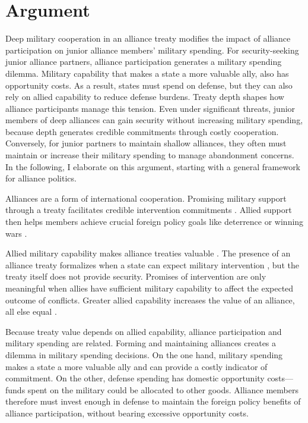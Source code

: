 \documentclass[12pt]{article}
\begin{document}
\section{Argument}

Deep military cooperation in an alliance treaty modifies the impact of alliance participation on junior alliance members' military spending.
For security-seeking junior alliance partners, alliance participation generates a military spending dilemma.
Military capability that makes a state a more valuable ally, also has opportunity costs. 
As a result, states must spend on defense, but they can also rely on allied capability to reduce defense burdens. 
Treaty depth shapes how alliance participants manage this tension. 
Even under significant threats, junior members of deep alliances can gain security without increasing military spending, because depth generates credible commitments through costly cooperation. 
Conversely, for junior partners to maintain shallow alliances, they often must maintain or increase their military spending to manage abandonment concerns. 
In the following, I elaborate on this argument, starting with a general framework for alliance politics. 


Alliances are a form of international cooperation. 
Promising military support through a treaty facilitates credible intervention commitments \citep{Fearon1997, Morrow2000}. 
Allied support then helps members achieve crucial foreign policy goals like deterrence or winning wars \citep{Walt1990, Snyder1997}. 


Allied military capability makes alliance treaties valuable \citep{FordhamPoast2014}. 
The presence of an alliance treaty formalizes when a state can expect military intervention \citep{Morrow2000}, but the treaty itself does not provide security. 
Promises of intervention are only meaningful when allies have sufficient military capability to affect the expected outcome of conflicts.  
Greater allied capability increases the value of an alliance, all else equal \citep{Johnsonetal2015}.


Because treaty value depends on allied capability, alliance participation and military spending are related. 
Forming and maintaining alliances creates a dilemma in military spending decisions. 
On the one hand, military spending makes a state a more valuable ally and can provide a costly indicator of commitment. 
On the other, defense spending has domestic opportunity costs--- funds spent on the military could be allocated to other goods. 
Alliance members therefore must invest enough in defense to maintain the foreign policy benefits of alliance participation, without bearing excessive opportunity costs. 
\end{document}
